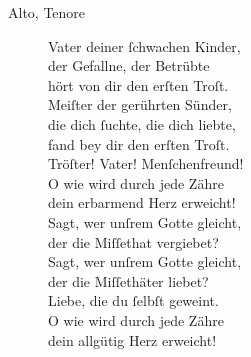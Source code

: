 \documentclass[parskip=full]{scrreprt}
\newif\iftemplate\templatetrue
\begin{document}
\begin{description}
  \item[Alto, Tenore]
  Vater deiner ſchwachen Kinder,\\
  der Gefallne, der Betrübte\\
  hört von dir den erſten Troſt.\\
  Meiſter der gerührten Sünder,\\
  die dich ſuchte, die dich liebte,\\
  fand bey dir den erſten Troſt.\\
  Tröſter! Vater! Menſchenfreund!\\
  O wie wird durch jede Zähre\\
  dein erbarmend Herz erweicht!\\
  Sagt, wer unſrem Gotte gleicht,\\
  der die Miſſethat vergiebet?\\
  Sagt, wer unſrem Gotte gleicht,\\
  der die Miſſethäter liebet?\\
  Liebe, die du ſelbſt geweint.\\
  O wie wird durch jede Zähre\\
  dein allgütig Herz erweicht!
\end{description}

\cleardoublepage
\fi

\iftemplate

\fi
\end{document}
